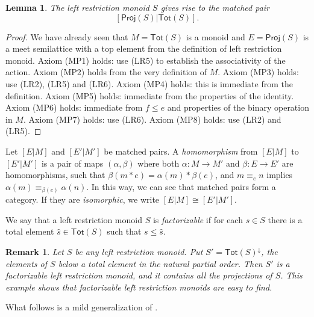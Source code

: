 \documentclass[a4paper]{amsart}
\newtheorem{lemma}[theorem]{Lemma}
\newtheorem{remark}[theorem]{Remark}
\begin{document}
\begin{lemma}
The left restriction monoid $S$ gives rise to the matched pair 
$$[\mathsf{Proj}(S)|\mathsf{Tot}(S)].$$
\end{lemma}
\begin{proof} We have already seen that $M = \mathsf{Tot}(S)$ is a monoid and $E = \mathsf{Proj}(S)$ is 
a meet semilattice with a top element from the definition of left restriction monoid. 
Axiom (MP1) holds: use (LR5) to establish the associativity of the action.
Axiom (MP2) holds from the very definition of $M$.
Axiom (MP3) holds: use (LR2), (LR5) and (LR6).
Axiom (MP4) holds: this is immediate from the definition.
Axiom (MP5) holds: immediate from the properties of the identity.
Axiom (MP6) holds: immediate from $f \leq e$ and properties of the binary operation in $M$.
Axiom (MP7) holds: use (LR6).
Axiom (MP8) holds: use (LR2) and (LR5).
\end{proof}

Let $[E|M]$ and $[E'|M']$ be matched pairs.
A {\em homomorphism} from $[E|M]$ to $[E'|M']$ is a pair of maps $(\alpha, \beta)$
where both $\alpha \colon M \rightarrow M'$ 
and
$\beta \colon E \rightarrow E'$ are homomorphisms,
such that $\beta (m \ast e) = \alpha (m) \ast \beta (e)$, and $m \equiv_{e} n$ implies $\alpha (m) \equiv_{\beta (e)} \alpha (n)$.
In this way, we can see that matched pairs form a category.
If they are {\em isomorphic}, we write  $[E|M] \cong [E'|M']$.

We say that a left restriction monoid $S$ is {\em factorizable} if for each $s \in S$ there is a total element $\hat{s} \in \mathsf{Tot}(S)$ such that $s \leq \hat{s}$.

\begin{remark}{\em Let $S$ be {\em any} left restriction monoid.
Put $S' = \mathsf{Tot}(S)^{\downarrow}$, the elements of $S$ below a total element in the natural partial order.
Then $S'$ is a factorizable left restriction monoid, and it contains all the projections of $S$. 
This example shows that factorizable left restriction monoids are easy to find.}
\end{remark}


What follows is a mild generalization of \cite[Proposition 3.3, Proposition 3.4, Theorem 3.5]{G2025}.
\end{document}
